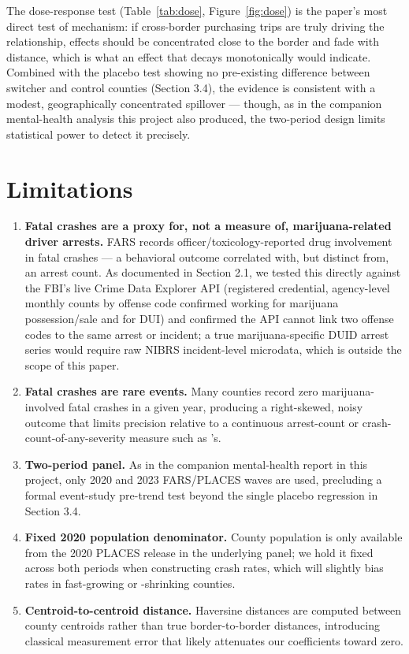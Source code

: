 \documentclass[11pt]{article}
\begin{document}
The dose-response test (Table~\ref{tab:dose}, Figure~\ref{fig:dose})
is the paper's most direct test of mechanism: if cross-border
purchasing trips are truly driving the relationship, effects should
be concentrated close to the border and fade with distance, which is
what an effect that decays monotonically would indicate. Combined
with the placebo test showing no pre-existing difference between
switcher and control counties (Section 3.4), the evidence is
consistent with a modest, geographically concentrated spillover ---
though, as in the companion mental-health analysis this project also
produced, the two-period design limits statistical power to detect it
precisely.

\section{Limitations}

\begin{enumerate}[label=(\arabic*), leftmargin=*]
\item \textbf{Fatal crashes are a proxy for, not a measure of,
marijuana-related driver arrests.} FARS records
officer/toxicology-reported drug involvement in fatal crashes --- a
behavioral outcome correlated with, but distinct from, an arrest
count. As documented in Section 2.1, we tested this directly against
the FBI's live Crime Data Explorer API (registered credential,
agency-level monthly counts by offense code confirmed working for
marijuana possession/sale and for DUI) and confirmed the API cannot
link two offense codes to the same arrest or incident; a true
marijuana-specific DUID arrest series would require raw NIBRS
incident-level microdata, which is outside the scope of this paper.

\item \textbf{Fatal crashes are rare events.} Many counties record
zero marijuana-involved fatal crashes in a given year, producing a
right-skewed, noisy outcome that limits precision relative to a
continuous arrest-count or crash-count-of-any-severity measure such as
\citet{Moyer2026}'s.

\item \textbf{Two-period panel.} As in the companion mental-health
report in this project, only 2020 and 2023 FARS/PLACES waves are
used, precluding a formal event-study pre-trend test beyond the
single placebo regression in Section 3.4.

\item \textbf{Fixed 2020 population denominator.} County population
is only available from the 2020 PLACES release in the underlying
panel; we hold it fixed across both periods when constructing crash
rates, which will slightly bias rates in fast-growing or -shrinking
counties.

\item \textbf{Centroid-to-centroid distance.} Haversine distances are
computed between county centroids rather than true border-to-border
distances, introducing classical measurement error that likely
attenuates our coefficients toward zero.
\end{enumerate}
\end{document}
